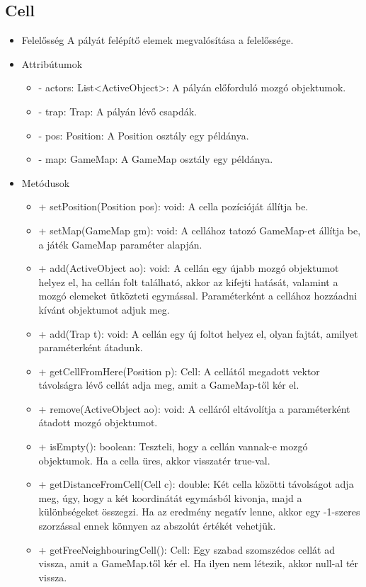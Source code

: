\subsection{Cell}
\begin{itemize}
	\item Felelősség\newline
	A pályát felépítő elemek megvalósítása a felelőssége.

	\item Attribútumok
		
	\begin{itemize}
		\item - actors: List<ActiveObject>: A pályán előforduló mozgó objektumok.
		\item - trap: Trap: A pályán lévő csapdák.
		\item - pos: Position: A Position osztály egy példánya.
		\item - map: GameMap: A GameMap osztály egy példánya.
	\end{itemize}
	\item Metódusok

	\begin{itemize}
		\item + setPosition(Position pos): void: A cella pozícióját állítja be.
		\item + setMap(GameMap gm): void: A cellához tatozó GameMap-et állítja be, a játék GameMap paraméter alapján.
		\item + add(ActiveObject ao): void: A cellán egy újabb mozgó objektumot helyez el, ha cellán folt található, akkor az kifejti hatását, valamint a mozgó elemeket ütközteti egymással. Paraméterként a cellához hozzáadni kívánt objektumot adjuk meg.
		\item + add(Trap t): void: A cellán egy új foltot helyez el, olyan fajtát, amilyet paraméterként átadunk.
		\item + getCellFromHere(Position p): Cell: A cellától megadott vektor távolságra lévő cellát adja meg, amit a GameMap-től kér el. 
		\item + remove(ActiveObject ao): void: A celláról eltávolítja a paraméterként átadott mozgó objektumot.
		\item + isEmpty(): boolean: Teszteli, hogy a cellán vannak-e mozgó objektumok. Ha a cella üres, akkor visszatér true-val. 
		\item + getDistanceFromCell(Cell c): double: Két cella közötti távolságot adja meg, úgy, hogy a két koordinátát egymásból kivonja, majd a különbségeket összegzi. Ha az eredmény negatív lenne, akkor egy -1-szeres szorzással ennek könnyen az abszolút értékét vehetjük.
		\item + getFreeNeighbouringCell(): Cell: Egy szabad szomszédos cellát ad vissza, amit a GameMap.től kér el. Ha ilyen nem létezik, akkor null-al tér vissza.
		
	\end{itemize}
\end{itemize}


